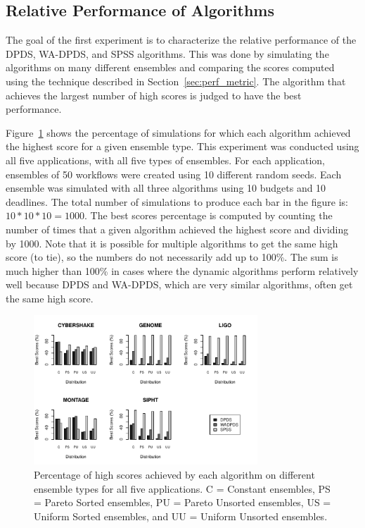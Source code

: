 \documentclass[conference]{IEEEtran}
\begin{document}
\subsection{Relative Performance of Algorithms}

The goal of the first experiment is to characterize the relative performance of the DPDS, WA-DPDS, and SPSS algorithms. This was done by simulating the algorithms on many different ensembles and comparing the scores computed using the technique described in Section~\ref{sec:perf_metric}. The algorithm that achieves the largest number of high scores is judged to have the best performance.

Figure~\ref{fig:distributions} shows the percentage of simulations for which each algorithm achieved the highest score for a given ensemble type. This experiment was conducted using all five applications, with all five types of ensembles. For each application, ensembles of 50 workflows were created using 10 different random seeds. Each ensemble was simulated with all three algorithms using 10 budgets and 10 deadlines. The total number of simulations to produce each bar in the figure is: $10 * 10 * 10 = 1000$. The best scores percentage is computed by counting the number of times that a given algorithm achieved the highest score and dividing by 1000. Note that it is possible for multiple algorithms to get the same high score (to tie), so the numbers do not necessarily add up to 100\%. The sum is much higher than 100\% in cases where the dynamic algorithms perform relatively well because DPDS and WA-DPDS, which are very similar algorithms, often get the same high score.

\begin{figure}[ht]
    \centering
    \includegraphics[width=0.75\textwidth]{run-finish-variations-test-0-output-distributions}
    \caption[Percentage of high scores achieved by each algorithm on different ensemble types for all five applications.]{Percentage of high scores achieved by each algorithm on different ensemble types for all five applications. C = Constant ensembles, PS = Pareto Sorted ensembles, PU = Pareto Unsorted ensembles, US = Uniform Sorted ensembles, and UU = Uniform Unsorted ensembles.}
    \label{fig:distributions}
\end{figure}
\end{document}

